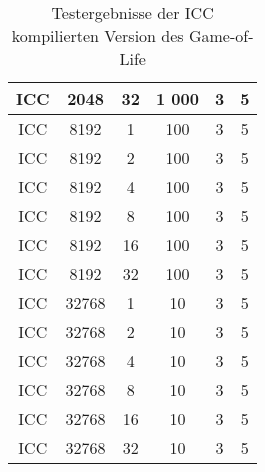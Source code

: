 \documentclass[german,plainarticle,hyperref,utf8,appendix]{zihpub}
\begin{document}
\begin{table}
\begin{center}
\begin{tabular}{||c c c c c c||}
			\hline
			ICC & 2048 & 32 & 1 000 & 3 & 5 \\
			\hline\hline
			ICC & 8192 & 1 & 100 & 3 & 5 \\ 
			\hline
			ICC & 8192 & 2 & 100 & 3 & 5 \\ 
			\hline
			ICC & 8192 & 4 & 100 & 3 & 5 \\ 
			\hline
			ICC & 8192 & 8 & 100 & 3 & 5 \\
			\hline
			ICC & 8192 & 16 & 100 & 3 & 5 \\
			\hline
			ICC & 8192 & 32 & 100 & 3 & 5 \\
			\hline\hline
			ICC & 32768 & 1 & 10 & 3 & 5 \\ 
			\hline
			ICC & 32768 & 2 & 10 & 3 & 5 \\ 
			\hline
			ICC & 32768 & 4 & 10 & 3 & 5 \\ 
			\hline
			ICC & 32768 & 8 & 10 & 3 & 5 \\
			\hline
			ICC & 32768 & 16 & 10 & 3 & 5 \\
			\hline
			ICC & 32768 & 32 & 10 & 3 & 5 \\
			\hline
		\end{tabular}
		\caption{\label{tab:icc}Testergebnisse der ICC kompilierten Version des Game-of-Life}
	\end{center}
\end{table}
\clearpage

\end{document}
